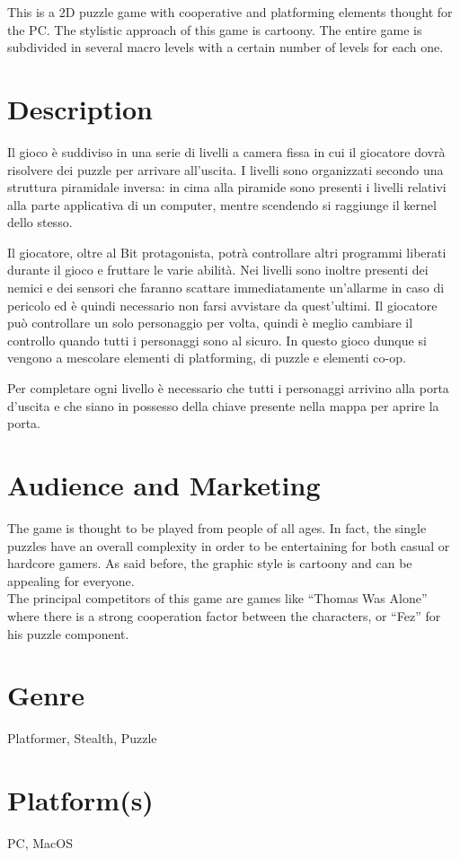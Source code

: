 \documentclass[12pt, a4paper]{report}
\begin{document}
This is a 2D puzzle game with cooperative and platforming elements thought for the PC. The stylistic approach of this game is cartoony. The entire game is subdivided in several macro levels with a certain number of levels for each one.

\section*{Description}
Il gioco è suddiviso in una serie di livelli a camera fissa in cui il giocatore dovrà risolvere dei puzzle per arrivare all'uscita. I livelli sono organizzati secondo una struttura piramidale inversa: in cima alla piramide sono presenti i livelli relativi alla parte applicativa di un computer, mentre scendendo si raggiunge il kernel dello stesso.

Il giocatore, oltre al Bit protagonista, potrà controllare altri programmi liberati durante il gioco e fruttare le varie abilità. Nei livelli sono inoltre presenti dei nemici e dei sensori che faranno scattare immediatamente un'allarme in caso di pericolo ed è quindi necessario non farsi avvistare da quest'ultimi. Il giocatore può controllare un solo personaggio per volta, quindi è meglio cambiare il controllo quando tutti i personaggi sono al sicuro. In questo gioco dunque si vengono a mescolare elementi di platforming, di puzzle e elementi co-op.

Per completare ogni livello è necessario che tutti i personaggi arrivino alla porta d'uscita e che siano in possesso della chiave presente nella mappa per aprire la porta.

\section*{Audience and Marketing}
The game is thought to be played from people of all ages. In fact, the single puzzles have an overall complexity in order to be entertaining for both casual or hardcore gamers. As said before, the graphic style is cartoony and can be appealing for everyone.\\
The principal competitors of this game are games like “Thomas Was Alone” where there is a strong cooperation factor between the characters, or “Fez” for his puzzle component.

\section*{Genre}
Platformer, Stealth, Puzzle
\section*{Platform(s)}
PC, MacOS
\end{document}
